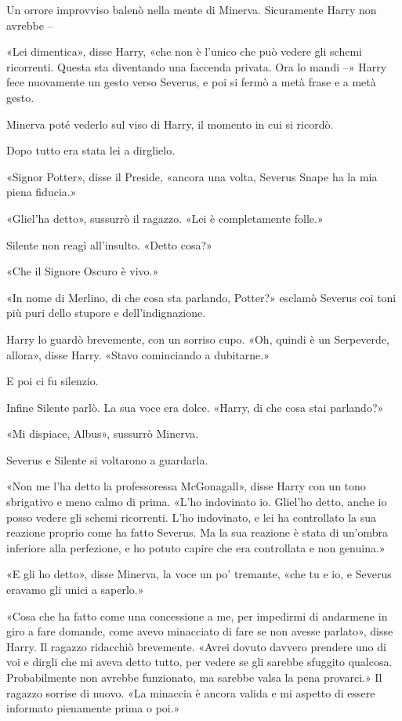 Un orrore improvviso balenò nella mente di Minerva. Sicuramente Harry non avrebbe –

«Lei dimentica», disse Harry, «che non è l’unico che può vedere gli schemi ricorrenti. Questa sta diventando una faccenda privata. Ora lo mandi –» Harry fece nuovamente un gesto verso Severus, e poi si fermò a metà frase e a metà gesto.

Minerva poté vederlo sul viso di Harry, il momento in cui si ricordò.

Dopo tutto era stata lei a dirglielo.

«Signor Potter», disse il Preside, «ancora una volta, Severus Snape ha la mia piena fiducia.»

«Gliel’ha detto», sussurrò il ragazzo. «Lei è completamente folle.»

Silente non reagì all’insulto. «Detto cosa?»

«Che il Signore Oscuro è vivo.»

«In nome di Merlino, di che cosa sta parlando, Potter?» esclamò Severus coi toni più puri dello stupore e dell’indignazione.

Harry lo guardò brevemente, con un sorriso cupo. «Oh, quindi è un Serpeverde, allora», disse Harry. «Stavo cominciando a dubitarne.»

E poi ci fu silenzio.

Infine Silente parlò. La sua voce era dolce. «Harry, di che cosa stai parlando?»

«Mi dispiace, Albus», sussurrò Minerva.

Severus e Silente si voltarono a guardarla.

«Non me l’ha detto la professoressa McGonagall», disse Harry con un tono sbrigativo e meno calmo di prima. «L’ho indovinato io. Gliel’ho detto, anche io posso vedere gli schemi ricorrenti. L’ho indovinato, e lei ha controllato la sua reazione proprio come ha fatto Severus. Ma la sua reazione è stata di un’ombra inferiore alla perfezione, e ho potuto capire che era controllata e non genuina.»

«E gli ho detto», disse Minerva, la voce un po’ tremante, «che tu e io, e Severus eravamo gli unici a saperlo.»

«Cosa che ha fatto come una concessione a me, per impedirmi di andarmene in giro a fare domande, come avevo minacciato di fare se non avesse parlato», disse Harry. Il ragazzo ridacchiò brevemente. «Avrei dovuto davvero prendere uno di voi e dirgli che mi aveva detto tutto, per vedere se gli sarebbe sfuggito qualcosa. Probabilmente non avrebbe funzionato, ma sarebbe valsa la pena provarci.» Il ragazzo sorrise di nuovo. «La minaccia è ancora valida e mi aspetto di essere informato pienamente prima o poi.»

